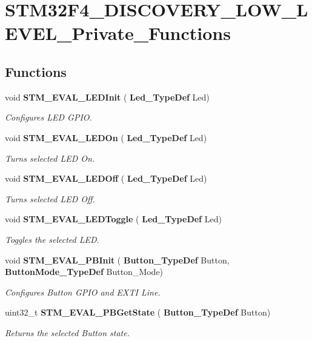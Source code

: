 \section{S\+T\+M32\+F4\+\_\+\+D\+I\+S\+C\+O\+V\+E\+R\+Y\+\_\+\+L\+O\+W\+\_\+\+L\+E\+V\+E\+L\+\_\+\+Private\+\_\+\+Functions}
\label{group__STM32F4__DISCOVERY__LOW__LEVEL__Private__Functions}
\subsection*{Functions}
\begin{DoxyCompactItemize}
\item 
void \textbf{ S\+T\+M\+\_\+\+E\+V\+A\+L\+\_\+\+L\+E\+D\+Init} (\textbf{ Led\+\_\+\+Type\+Def} Led)
\begin{DoxyCompactList}\small\item\em Configures L\+ED G\+P\+IO. \end{DoxyCompactList}\item 
void \textbf{ S\+T\+M\+\_\+\+E\+V\+A\+L\+\_\+\+L\+E\+D\+On} (\textbf{ Led\+\_\+\+Type\+Def} Led)
\begin{DoxyCompactList}\small\item\em Turns selected L\+ED On. \end{DoxyCompactList}\item 
void \textbf{ S\+T\+M\+\_\+\+E\+V\+A\+L\+\_\+\+L\+E\+D\+Off} (\textbf{ Led\+\_\+\+Type\+Def} Led)
\begin{DoxyCompactList}\small\item\em Turns selected L\+ED Off. \end{DoxyCompactList}\item 
void \textbf{ S\+T\+M\+\_\+\+E\+V\+A\+L\+\_\+\+L\+E\+D\+Toggle} (\textbf{ Led\+\_\+\+Type\+Def} Led)
\begin{DoxyCompactList}\small\item\em Toggles the selected L\+ED. \end{DoxyCompactList}\item 
void \textbf{ S\+T\+M\+\_\+\+E\+V\+A\+L\+\_\+\+P\+B\+Init} (\textbf{ Button\+\_\+\+Type\+Def} Button, \textbf{ Button\+Mode\+\_\+\+Type\+Def} Button\+\_\+\+Mode)
\begin{DoxyCompactList}\small\item\em Configures Button G\+P\+IO and E\+X\+TI Line. \end{DoxyCompactList}\item 
uint32\+\_\+t \textbf{ S\+T\+M\+\_\+\+E\+V\+A\+L\+\_\+\+P\+B\+Get\+State} (\textbf{ Button\+\_\+\+Type\+Def} Button)
\begin{DoxyCompactList}\small\item\em Returns the selected Button state. \end{DoxyCompactList}\end{DoxyCompactItemize}



